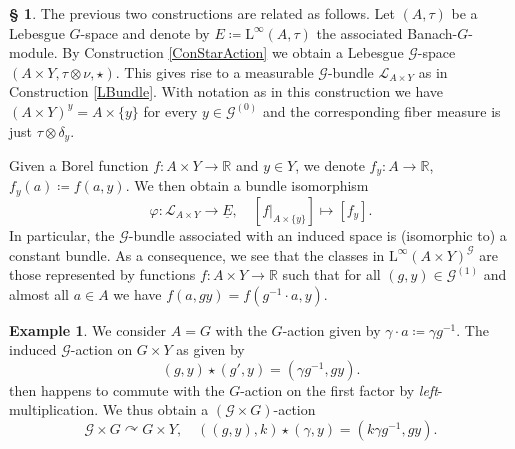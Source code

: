 \documentclass[11pt, oneside]{amsart}
\theoremstyle{definition}
\newtheorem{example}[lemma]{Example}
\newtheorem{no}[lemma]{\S}
\theoremstyle{remark}
\theoremstyle{TheoremNum}
\newcommand{\Linf}{\mathrm{L}^{\infty}}
\newcommand{\cG}{\mathcal{G}}
\newcommand{\bR}{\mathbb{R}}
\renewcommand{\phi}{\varphi}
\newcommand{\cL}{\mathcal L}
\begin{document}
\begin{no}\label{InducedBundle} The previous two constructions are related as follows. Let $(A, \tau)$ be a Lebesgue $G$-space and denote by $E \coloneqq \Linf(A,\tau)$ the associated Banach-$G$-module. By Construction \ref{ConStarAction} we obtain a Lebesgue $\cG$-space $(A \times Y, \tau \otimes \nu, \star)$. This gives rise to a measurable $\cG$-bundle $\cL_{A \times Y}$ as in Construction \ref{LBundle}. With notation as in this construction we have
$(A \times Y)^y = A \times \{y\}$ for every $y \in \cG^{(0)}$ and the corresponding fiber measure is just $\tau \otimes \delta_y$. 

\item Given a Borel function $f: A \times Y\to \bR$ and $y \in Y$, we denote $f_y: A \to \bR$, $f_y(a) \coloneqq f(a,y)$. We then obtain a bundle isomorphism
\[
\phi:  \cL_{A \times Y} \to \underline{E}, \quad [f|_{A \times \{y\}}] \mapsto [f_y].
\]
In particular, the $\cG$-bundle associated with an induced space is (isomorphic to) a constant bundle. As a consequence, we see that the classes in $\Linf(A \times Y)^{\cG}$ are those represented by functions $f: A \times Y \to \bR$ such that
for all $(g,y) \in \cG^{(1)}$ and almost all $a \in A$ we have
$f(a, g y) = f(g^{-1} \cdot a, y)$.
\end{no}
\begin{example}\label{StarActionG} We consider $A = G$ with the $G$-action given by $\gamma \cdot a \coloneqq \gamma g^{-1}$. The induced $\cG$-action on $G \times Y$ as given by
\[
(g,y) \star (g', y) = (\gamma g^{-1}, gy).
\]
then happens to commute with the $G$-action on the first factor by  \emph{left}-multiplication. We thus obtain a $(\cG \times G)$-action 
\begin{equation}\label{MEAction}
\cG \times G \curvearrowright G \times Y, \quad ((g,y), k) \star (\gamma , y) = (k\gamma g^{-1}, gy).\tag{$\star$}
\end{equation}
\end{example}
\end{document}
